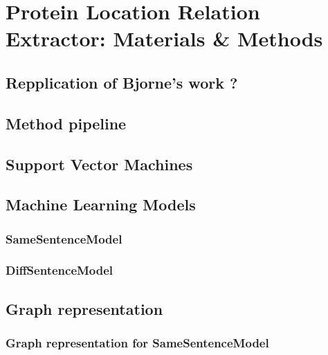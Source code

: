 \chapter{Protein Location Relation Extractor: Materials \& Methods}\label{chapter:methods}

\section{Repplication of Bjorne's work ?}


\section{Method pipeline}


\section{Support Vector Machines}

 
\section{Machine Learning Models}

\subsection{SameSentenceModel}

\subsection{DiffSentenceModel}

\section{Graph representation}

\subsection{Graph representation for SameSentenceModel}

